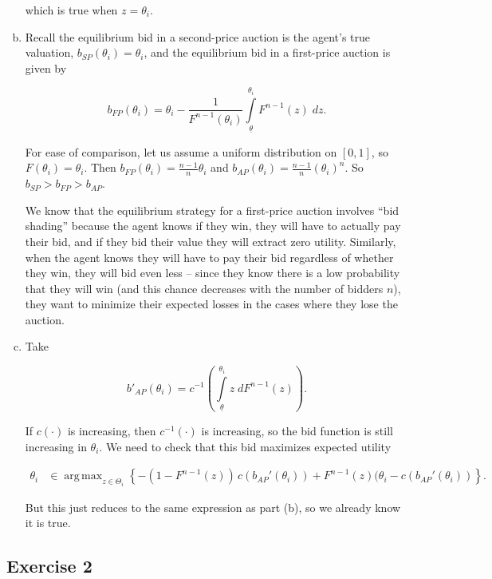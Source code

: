 \documentclass{article}
\DeclareMathOperator*{\argmax}{arg\,max}
\begin{document}
\begin{enumerate}[(a)]
	which is true when $z = \theta_i$.

	\item

	Recall the equilibrium bid in a second-price auction is the agent's true valuation, $b_{SP}(\theta_i) = \theta_i$, and the equilibrium bid in a first-price auction is given by

	$$b_{FP}(\theta_i) = \theta_i - \frac{1}{F^{n-1}(\theta_i)} \int \limits_{\underline{\theta}}^{\theta_i} F^{n-1}(z) \; dz .$$

	For ease of comparison, let us assume a uniform distribution on $[0,1]$, so $F(\theta_i) = \theta_i$. Then $b_{FP}(\theta_i) = \frac{n-1}{n} \theta_i$ and $b_{AP}(\theta_i) = \frac{n-1}{n} (\theta_i)^n$. So $b_{SP} > b_{FP} > b_{AP}$.

	We know that the equilibrium strategy for a first-price auction involves ``bid shading'' because the agent knows if they win, they will have to actually pay their bid, and if they bid their value they will extract zero utility. Similarly, when the agent knows they will have to pay their bid regardless of whether they win, they will bid even less -- since they know there is a low probability that they will win (and this chance decreases with the number of bidders $n$), they want to minimize their expected losses in the cases where they lose the auction.

	\item 

	Take

	$$b'_{AP}(\theta_i) = c^{-1} \left( \int \limits_{\underline{\theta}}^{\theta_i} z \; dF^{n-1}(z) \right).$$

	If $c(\cdot)$ is increasing, then $c^{-1}(\cdot)$ is increasing, so the bid function is still increasing in $\theta_i$. We need to check that this bid maximizes expected utility

	\begin{align*}
	\theta_i &\in \argmax_{z \in \Theta_i} \left\{ -(1 - F^{n-1}(z)) \, c(b_{AP}'(\theta_i)) + F^{n-1}(z) (\theta_i - c(b_{AP}'(\theta_i)) \right\}.
	\end{align*}

	But this just reduces to the same expression as part (b), so we already know it is true.

\end{enumerate}

\subsection*{Exercise 2}
\end{document}
